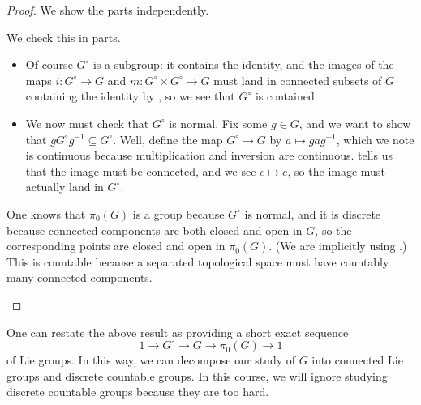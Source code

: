 \documentclass[../notes.tex]{subfiles}
\begin{document}
\begin{proof}
	We show the parts independently.
	\begin{listalph}
		\item We check this in parts.
		\begin{itemize}
			\item Of course $G^\circ$ is a subgroup: it contains the identity, and the images of the maps $i\colon G^\circ\to G$ and $m\colon G^\circ\times G^\circ\to G$ must land in connected subsets of $G$ containing the identity by , so we see that $G^\circ$ is contained 
			\item We now must check that $G^\circ$ is normal. Fix some $g\in G$, and we want to show that $gG^\circ g^{-1}\subseteq G^\circ$. Well, define the map $G^\circ\to G$ by $a\mapsto gag^{-1}$, which we note is continuous because multiplication and inversion are continuous.  tells us that the image must be connected, and we see $e\mapsto e$, so the image must actually land in $G^\circ$.
		\end{itemize}
		\item One knows that $\pi_0(G)$ is a group because $G^\circ$ is normal, and it is discrete because connected components are both closed and open in $G$, so the corresponding points are closed and open in $\pi_0(G)$. (We are implicitly using .) This is countable because a separated topological space must have countably many connected components.
		\qedhere
	\end{listalph}
\end{proof}
\begin{remark}
	One can restate the above result as providing a short exact sequence
	\[1\to G^\circ\to G\to\pi_0(G)\to1\]
	of Lie groups. In this way, we can decompose our study of $G$ into connected Lie groups and discrete countable groups. In this course, we will ignore studying discrete countable groups because they are too hard.
\end{remark}
\end{document}
